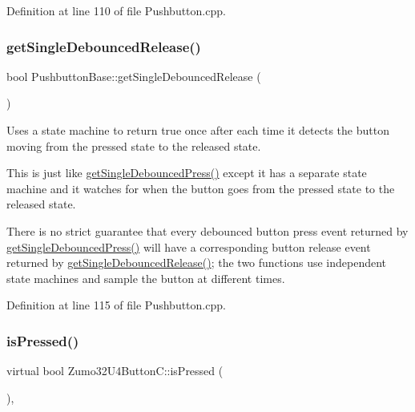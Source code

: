 Definition at line 110 of file Pushbutton.\+cpp.

\mbox{\label{class_pushbutton_base_ae568f5db0e8804247e0dcab72a311d42}} 
\subsubsection{\texorpdfstring{get\+Single\+Debounced\+Release()}{getSingleDebouncedRelease()}}
{\footnotesize\ttfamily bool Pushbutton\+Base\+::get\+Single\+Debounced\+Release (\begin{DoxyParamCaption}{ }\end{DoxyParamCaption})\hspace{0.3cm}{\ttfamily [inherited]}}



Uses a state machine to return true once after each time it detects the button moving from the pressed state to the released state. 

This is just like \hyperlink{class_pushbutton_base_a93953875c8b1c5f69dec3984774de296}{get\+Single\+Debounced\+Press()} except it has a separate state machine and it watches for when the button goes from the pressed state to the released state.

There is no strict guarantee that every debounced button press event returned by \hyperlink{class_pushbutton_base_a93953875c8b1c5f69dec3984774de296}{get\+Single\+Debounced\+Press()} will have a corresponding button release event returned by \hyperlink{class_pushbutton_base_ae568f5db0e8804247e0dcab72a311d42}{get\+Single\+Debounced\+Release()}; the two functions use independent state machines and sample the button at different times. 

Definition at line 115 of file Pushbutton.\+cpp.

\mbox{\label{class_zumo32_u4_button_c_aa75e220cde340487a3fa8f1f99d645f8}} 
\subsubsection{\texorpdfstring{is\+Pressed()}{isPressed()}}
{\footnotesize\ttfamily virtual bool Zumo32\+U4\+Button\+C\+::is\+Pressed (\begin{DoxyParamCaption}{ }\end{DoxyParamCaption})\hspace{0.3cm}{\ttfamily [inline]}, {\ttfamily [virtual]}}




